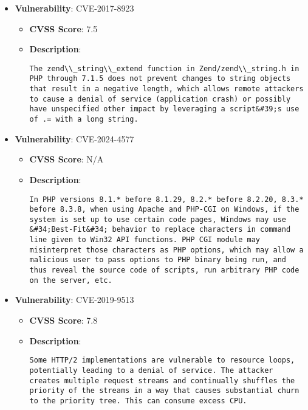 \documentclass{article}
\begin{document}
\begin{itemize}
        \item \textbf{Vulnerability}: CVE-2017-8923
        \begin{itemize}
            \item \textbf{CVSS Score}:  7.5 
            \item \textbf{Description}:
            \parbox[t]{0.9\linewidth}{
                \verb|The zend\\_string\\_extend function in Zend/zend\\_string.h in PHP through 7.1.5 does not prevent changes to string objects that result in a negative length, which allows remote attackers to cause a denial of service (application crash) or possibly have unspecified other impact by leveraging a script&#39;s use of .= with a long string.|
            }
        \end{itemize}
    
        \item \textbf{Vulnerability}: CVE-2024-4577
        \begin{itemize}
            \item \textbf{CVSS Score}:  N/A 
            \item \textbf{Description}:
            \parbox[t]{0.9\linewidth}{
                \verb|In PHP versions 8.1.* before 8.1.29, 8.2.* before 8.2.20, 8.3.* before 8.3.8, when using Apache and PHP-CGI on Windows, if the system is set up to use certain code pages, Windows may use &#34;Best-Fit&#34; behavior to replace characters in command line given to Win32 API functions. PHP CGI module may misinterpret those characters as PHP options, which may allow a malicious user to pass options to PHP binary being run, and thus reveal the source code of scripts, run arbitrary PHP code on the server, etc.|
            }
        \end{itemize}
    
        \item \textbf{Vulnerability}: CVE-2019-9513
        \begin{itemize}
            \item \textbf{CVSS Score}:  7.8 
            \item \textbf{Description}:
            \parbox[t]{0.9\linewidth}{
                \verb|Some HTTP/2 implementations are vulnerable to resource loops, potentially leading to a denial of service. The attacker creates multiple request streams and continually shuffles the priority of the streams in a way that causes substantial churn to the priority tree. This can consume excess CPU.|
            }
        \end{itemize}
    

\end{itemize}
\end{document}
